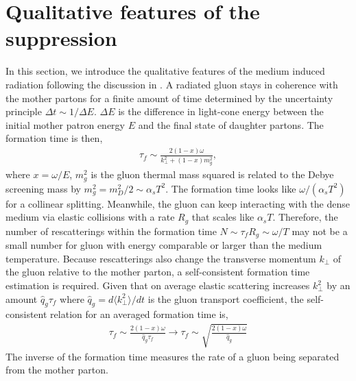 \documentclass[aps, prc, reprint, amsmath, groupedaddress, nofootinbib]{revtex4-1}
\begin{document}
\section{Qualitative features of the suppression}\label{section:qual}
In this section, we introduce the qualitative features of the medium induced radiation following the discussion in \cite{Baier:1996kr}.
A radiated gluon stays in coherence with the mother partons for a finite amount of time determined by the uncertainty principle $\Delta t \sim 1/\Delta E$. 
$\Delta E$ is the difference in light-cone energy between the initial mother patron energy $E$ and the final state of daughter partons.
The formation time is then,
\begin{eqnarray}\label{eq:tau_1}
\tau_f \sim \frac{2(1-x)\omega}{k_\perp^2+(1-x)m_g^2},
\end{eqnarray}
where $x = \omega/E$, $m_g^2$ is the gluon thermal mass squared is related to the Debye screening mass by $m_g^2 = m_D^2/2 \sim \alpha_s T^2$.
The formation time looks like $\omega/(\alpha_s T^2)$ for a collinear splitting.
Meanwhile, the gluon can keep interacting with the dense medium via elastic collisions with a rate $R_{g}$ that scales like $\alpha_s T$. 
Therefore, the number of rescatterings within the formation time $N \sim \tau_f R_g \sim \omega/T$ may not be a small number for gluon with energy comparable or larger than the medium temperature.
Because rescatterings also change the transverse momentum $k_\perp$ of the gluon relative to the mother parton, a self-consistent formation time estimation is required.
Given that on average elastic scattering increases $k_\perp^2$ by an amount $\hat{q}_g\tau_f$ where $\hat{q}_g = d\langle k_\perp^2\rangle/dt$ is the gluon transport coefficient, the self-consistent relation for an averaged formation time is,
\begin{eqnarray}\label{eq:tau_n}
\tau_f \sim \frac{2(1-x)\omega}{\hat{q}_g\tau_f} \longrightarrow \tau_f \sim \sqrt{\frac{2(1-x)\omega}{\hat{q}_g}}
\end{eqnarray}
The inverse of the formation time measures the rate of a gluon being separated from the mother parton.
\end{document}
